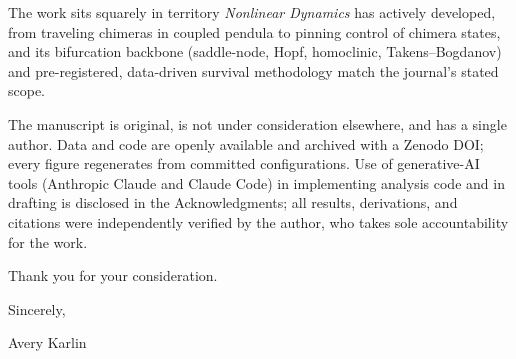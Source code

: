 \documentclass[11pt]{article}
\begin{document}
The work sits squarely in territory \emph{Nonlinear Dynamics} has actively developed, from traveling chimeras in coupled pendula to pinning control of chimera states, and its bifurcation backbone (saddle-node, Hopf, homoclinic, Takens--Bogdanov) and pre-registered, data-driven survival methodology match the journal's stated scope.

The manuscript is original, is not under consideration elsewhere, and has a single author. Data and code are openly available and archived with a Zenodo DOI; every figure regenerates from committed configurations. Use of generative-AI tools (Anthropic Claude and Claude Code) in implementing analysis code and in drafting is disclosed in the Acknowledgments; all results, derivations, and citations were independently verified by the author, who takes sole accountability for the work.

Thank you for your consideration.

Sincerely,

Avery Karlin
\end{document}
